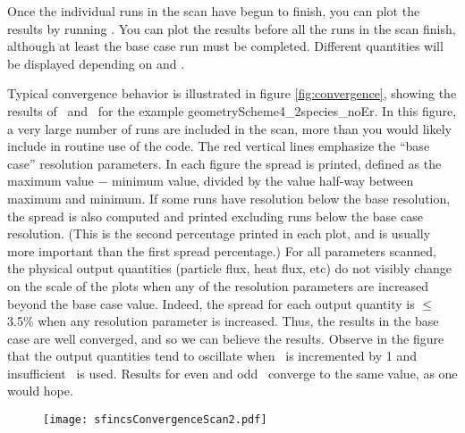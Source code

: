 Once the individual runs in the scan have begun to finish, you can plot the results by running \sfincsScanPlot.
You can plot the results before all the runs in the scan finish, although at least the base case
run must be completed.  Different quantities will be displayed depending on
 and .

Typical convergence behavior is illustrated in figure \ref{fig:convergence},
showing the results of \sfincsScan~and \sfincsScanPlot~for the example
{\ttfamily geometryScheme4\_2species\_noEr}.
In this figure, a very large number of runs are included in the scan,
more than you would likely include in routine use of the code.
The red vertical lines emphasize the ``base case'' resolution parameters.
In each figure the spread is printed, defined as the maximum value $-$ minimum value,
divided by the value half-way between maximum and minimum.
If some runs have resolution below the base resolution,
the spread is also computed and printed
excluding runs below the base case resolution. (This is the second percentage printed in each plot,
and is usually more important than the first spread percentage.)
For all parameters scanned, the physical output quantities (particle flux, heat flux, etc)
do not visibly change on the scale of the plots when any of the resolution parameters
are increased beyond the base case value.  Indeed, the spread for each output quantity is $\le$ 3.5\%
when any resolution parameter is increased.
Thus, the results in the base case are well converged,
and so we can believe the results.
Observe in the figure that the output quantities tend to oscillate when \Nxi~is incremented by 1 and insufficient
\Nxi~is used. Results for even and odd \Nxi~converge to the same value, as one would hope.

\begin{figure}
\begin{center}
\texttt{[image: sfincsConvergenceScan2.pdf]}
\end{center}
\end{figure}

